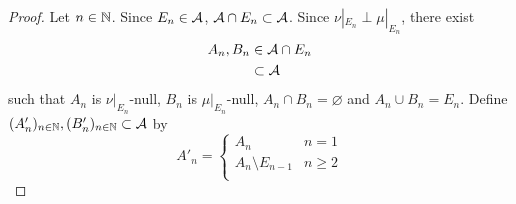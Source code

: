 \documentclass{book}
\begin{document}
	\begin{proof}
		Let $n \in \mathbb{N}$. Since $E_n \in \mathcal{A}$, $\mathcal{A} \cap E_n \subset \mathcal{A}$. Since $\nu|_{E_n} \perp \mu|_{E_n}$, there exist
		\begin{align*}
			A_n, B_n 
			& \in \mathcal{A} \cap E_n \\
			& \subset \mathcal{A}
		\end{align*}
		such that $A_n$ is $\nu|_{E_n}$-null, $B_n$ is $\mu|_{E_n}$-null, $A_n \cap B_n = \varnothing$ and $A_n \cup B_n = E_n$. Define $(A'_n)_{n \in \mathbb{N}}, (B'_n)_{n \in \mathbb{N}} \subset \mathcal{A}$ by 
		\[
		A'_n =
		\begin{cases}
			A_n & n = 1 \\
			A_n \setminus E_{n-1} & n \geq 2 \\
		\end{cases}
		\]
		

\end{proof}
\end{document}
